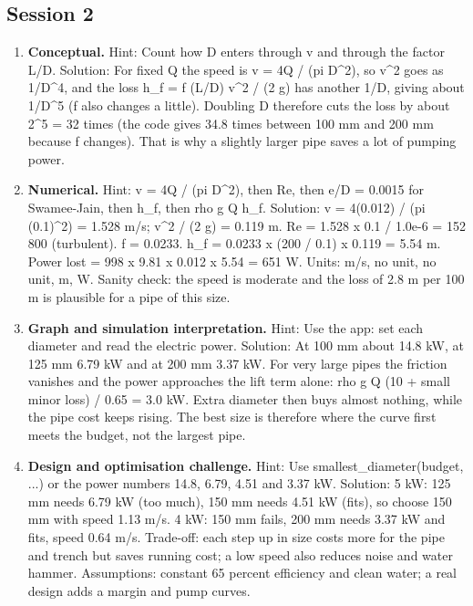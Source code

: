 \documentclass[11pt,a4paper]{article}
\begin{document}
\subsection*{Session 2}
\begin{enumerate}[nosep]
\item \textbf{Conceptual.} Hint: Count how D enters through v and through the factor L/D. Solution: For fixed Q the speed is v = 4Q / (pi D\textasciicircum{}2), so v\textasciicircum{}2 goes as 1/D\textasciicircum{}4, and the loss h\_f = f (L/D) v\textasciicircum{}2 / (2 g) has another 1/D, giving about 1/D\textasciicircum{}5 (f also changes a little). Doubling D therefore cuts the loss by about 2\textasciicircum{}5 = 32 times (the code gives 34.8 times between 100 mm and 200 mm because f changes). That is why a slightly larger pipe saves a lot of pumping power.
\item \textbf{Numerical.} Hint: v = 4Q / (pi D\textasciicircum{}2), then Re, then e/D = 0.0015 for Swamee-Jain, then h\_f, then rho g Q h\_f. Solution: v = 4(0.012) / (pi (0.1)\textasciicircum{}2) = 1.528 m/s; v\textasciicircum{}2 / (2 g) = 0.119 m. Re = 1.528 x 0.1 / 1.0e-6 = 152 800 (turbulent). f = 0.0233. h\_f = 0.0233 x (200 / 0.1) x 0.119 = 5.54 m. Power lost = 998 x 9.81 x 0.012 x 5.54 = 651 W. Units: m/s, no unit, no unit, m, W. Sanity check: the speed is moderate and the loss of 2.8 m per 100 m is plausible for a pipe of this size.
\item \textbf{Graph and simulation interpretation.} Hint: Use the app: set each diameter and read the electric power. Solution: At 100 mm about 14.8 kW, at 125 mm 6.79 kW and at 200 mm 3.37 kW. For very large pipes the friction vanishes and the power approaches the lift term alone: rho g Q (10 + small minor loss) / 0.65 = 3.0 kW. Extra diameter then buys almost nothing, while the pipe cost keeps rising. The best size is therefore where the curve first meets the budget, not the largest pipe.
\item \textbf{Design and optimisation challenge.} Hint: Use smallest\_diameter(budget, ...) or the power numbers 14.8, 6.79, 4.51 and 3.37 kW. Solution: 5 kW: 125 mm needs 6.79 kW (too much), 150 mm needs 4.51 kW (fits), so choose 150 mm with speed 1.13 m/s. 4 kW: 150 mm fails, 200 mm needs 3.37 kW and fits, speed 0.64 m/s. Trade-off: each step up in size costs more for the pipe and trench but saves running cost; a low speed also reduces noise and water hammer. Assumptions: constant 65 percent efficiency and clean water; a real design adds a margin and pump curves.
\end{enumerate}
\end{document}
